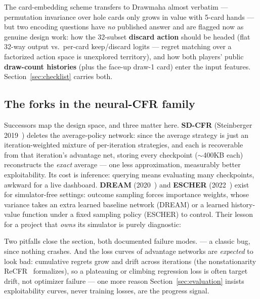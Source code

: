 The card-embedding scheme transfers to Drawmaha almost verbatim --- permutation invariance over hole cards only grows in value with 5-card hands --- but two encoding questions have \emph{no} published answer and are flagged now as genuine design work: how the 32-subset \textbf{discard action} should be headed (flat 32-way output vs.\ per-card keep/discard logits --- regret matching over a factorized action space is unexplored territory), and how both players' public \textbf{draw-count histories} (plus the face-up draw-1 card) enter the input features. Section~\ref{sec:checklist} carries both.

\subsection*{The forks in the neural-CFR family}

Successors map the design space, and three matter here. \textbf{SD-CFR} (Steinberger 2019~\cite{steinberger2019}) deletes the average-policy network: since the average strategy is just an iteration-weighted mixture of per-iteration strategies, and each is recoverable from that iteration's advantage net, storing every checkpoint ($\sim$400KB each) reconstructs the \emph{exact} average --- one less approximation, measurably better exploitability. Its cost is inference: querying means evaluating many checkpoints, awkward for a live dashboard. \textbf{DREAM} (2020~\cite{steinberger2020dream}) and \textbf{ESCHER} (2022~\cite{mcaleer2022}) exist for simulator-free settings: outcome sampling forces importance weights, whose variance takes an extra learned baseline network (DREAM) or a learned history-value function under a fixed sampling policy (ESCHER) to control. Their lesson for a project that \emph{owns} its simulator is purely diagnostic: 

Two pitfalls close the section, both documented failure modes.  --- a classic bug, since nothing crashes. And the loss curves of advantage networks are \emph{expected} to look bad: cumulative regrets grow and drift across iterations (the nonstationarity ReCFR~\cite{liu2022recfr} formalizes), so a plateauing or climbing regression loss is often target drift, not optimizer failure --- one more reason Section~\ref{sec:evaluation} insists exploitability curves, never training losses, are the progress signal.
